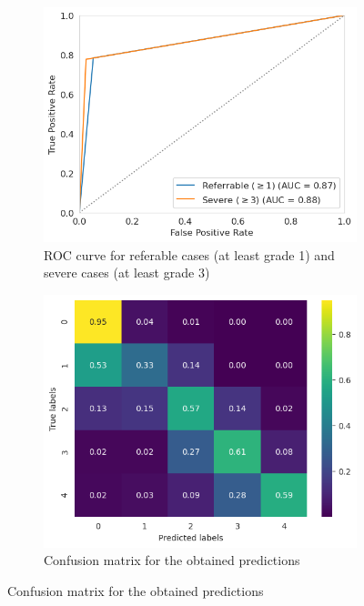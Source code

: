 \begin{figure}[tb]
     \centering
     \begin{subfigure}[b]{0.49\textwidth}
        \centering
        \includegraphics[width=\textwidth,height=.9\textwidth]{figures/chapter5/roc.png}
        \caption{ROC curve for referable cases (at least grade 1) and severe cases (at least grade 3)}
        \label{fig:roc}
     \end{subfigure}
     \hfill
     \begin{subfigure}[b]{0.49\textwidth}
        \includegraphics[width=\textwidth,height=.9\textwidth]{figures/chapter5/confusion.png}
        \caption{Confusion matrix for the obtained predictions}
        \label{fig:confusion}
     \end{subfigure}
     \hfill

    \centering
\end{figure}

